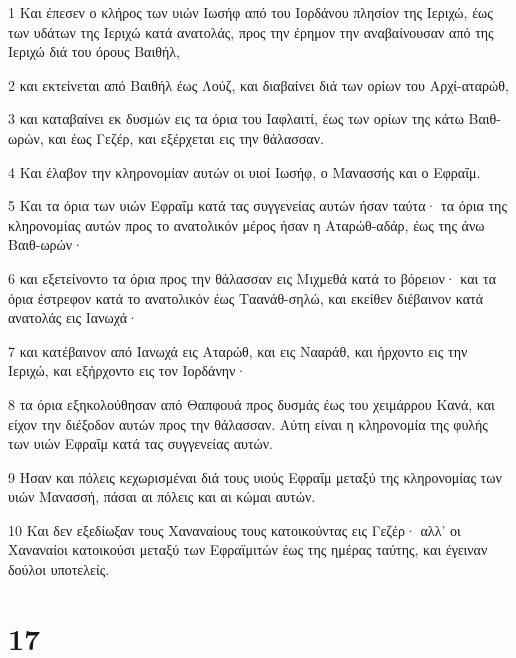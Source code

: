 \par 1 Και έπεσεν ο κλήρος των υιών Ιωσήφ από του Ιορδάνου πλησίον της Ιεριχώ, έως των υδάτων της Ιεριχώ κατά ανατολάς, προς την έρημον την αναβαίνουσαν από της Ιεριχώ διά του όρους Βαιθήλ,
\par 2 και εκτείνεται από Βαιθήλ έως Λούζ, και διαβαίνει διά των ορίων του Αρχί-αταρώθ,
\par 3 και καταβαίνει εκ δυσμών εις τα όρια του Ιαφλαιτί, έως των ορίων της κάτω Βαιθ-ωρών, και έως Γεζέρ, και εξέρχεται εις την θάλασσαν.
\par 4 Και έλαβον την κληρονομίαν αυτών οι υιοί Ιωσήφ, ο Μανασσής και ο Εφραΐμ.
\par 5 Και τα όρια των υιών Εφραΐμ κατά τας συγγενείας αυτών ήσαν ταύτα· τα όρια της κληρονομίας αυτών προς το ανατολικόν μέρος ήσαν η Αταρώθ-αδάρ, έως της άνω Βαιθ-ωρών·
\par 6 και εξετείνοντο τα όρια προς την θάλασσαν εις Μιχμεθά κατά το βόρειον· και τα όρια έστρεφον κατά το ανατολικόν έως Ταανάθ-σηλώ, και εκείθεν διέβαινον κατά ανατολάς εις Ιανωχά·
\par 7 και κατέβαινον από Ιανωχά εις Αταρώθ, και εις Νααράθ, και ήρχοντο εις την Ιεριχώ, και εξήρχοντο εις τον Ιορδάνην·
\par 8 τα όρια εξηκολούθησαν από Θαπφουά προς δυσμάς έως του χειμάρρου Κανά, και είχον την διέξοδον αυτών προς την θάλασσαν. Αύτη είναι η κληρονομία της φυλής των υιών Εφραΐμ κατά τας συγγενείας αυτών.
\par 9 Ήσαν και πόλεις κεχωρισμέναι διά τους υιούς Εφραΐμ μεταξύ της κληρονομίας των υιών Μανασσή, πάσαι αι πόλεις και αι κώμαι αυτών.
\par 10 Και δεν εξεδίωξαν τους Χαναναίους τους κατοικούντας εις Γεζέρ· αλλ' οι Χαναναίοι κατοικούσι μεταξύ των Εφραϊμιτών έως της ημέρας ταύτης, και έγειναν δούλοι υποτελείς.

\chapter{17}

